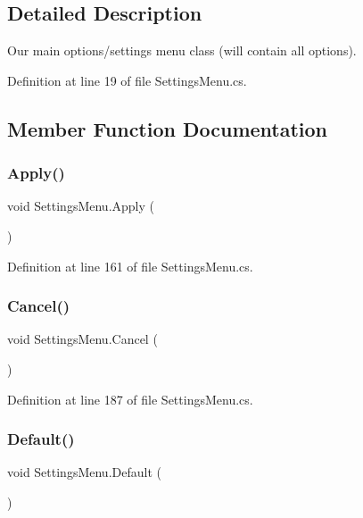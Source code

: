 \subsection{Detailed Description}
Our main options/settings menu class (will contain all options). 



Definition at line 19 of file Settings\+Menu.\+cs.



\subsection{Member Function Documentation}
\mbox{\label{class_settings_menu_ac3618fb688293045ea9a39f8c5f0bc48}} 
\subsubsection{\texorpdfstring{Apply()}{Apply()}}
{\footnotesize\ttfamily void Settings\+Menu.\+Apply (\begin{DoxyParamCaption}{ }\end{DoxyParamCaption})}



Definition at line 161 of file Settings\+Menu.\+cs.

\mbox{\label{class_settings_menu_a0a582f46170a8f49524622aad9adbafa}} 
\subsubsection{\texorpdfstring{Cancel()}{Cancel()}}
{\footnotesize\ttfamily void Settings\+Menu.\+Cancel (\begin{DoxyParamCaption}{ }\end{DoxyParamCaption})}



Definition at line 187 of file Settings\+Menu.\+cs.

\mbox{\label{class_settings_menu_aacc7ff5721b45cef7758564fea7b3b66}} 
\subsubsection{\texorpdfstring{Default()}{Default()}}
{\footnotesize\ttfamily void Settings\+Menu.\+Default (\begin{DoxyParamCaption}{ }\end{DoxyParamCaption})}



